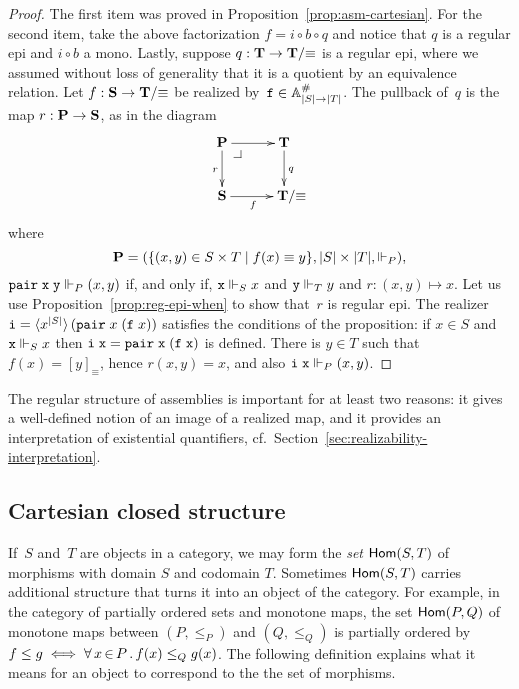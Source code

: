 \begin{proof}
  The first item was proved in Proposition~\ref{prop:asm-cartesian}.
  For the second item, take the above factorization $f = i \circ b
  \circ q$ and notice that $q$ is a regular epi and $i \circ b$ a
  mono. Lastly, suppose $q : \mathbf{T} \to \mathbf{T}/{\equiv}$ is a
  regular epi, where we assumed without loss of generality that it is
  a quotient by an equivalence relation. Let $f : \mathbf{S} \to
  \mathbf{T}/{\equiv}$ be realized by~$\mathtt{f} \in \mathbb{A}^{\#}_{|S| \to |T|}$.
  The pullback of~$q$ is the map $r : \mathbf{P} \to \mathbf{S}$, as in the
  diagram
  \begin{equation*}
    \xymatrix{
      {\asm{P}} \pbcorner
      \ar[r]
      \ar[d]_{r}
      &
      {\asm{T}}
      \ar[d]^{q}
      \\
      {\asm{S}}
      \ar[r]_{f}
      &
      **[r]{\asm{T}/{\equiv}}
      }
  \end{equation*}
  where
  \begin{equation*}
    \mathbf{P} = (\{(x,y) \in S \times T \mid f(x) \equiv y\},
               |S| \times |T|, {\Vdash_P}),
  \end{equation*}
  $\mathtt{pair}\;\mathtt{x}\;\mathtt{y} \Vdash_P (x,y)$ if, and only if, $\mathtt{x} \Vdash_S
  x$ and $\mathtt{y} \Vdash_T y$ and $r : (x,y) \mapsto x$. Let us use
  Proposition~\ref{prop:reg-epi-when} to show that~$r$ is regular epi.
  The realizer $\mathtt{i} =
  \langle x^{|S|} \rangle\,(\mathtt{pair}\;x\;(\mathtt{f}\;x))$ satisfies the
  conditions of the proposition: if $x \in S$ and $\mathtt{x} \Vdash_S x$ then
  $\mathtt{i}\;\mathtt{x} = \mathtt{pair}\;\mathtt{x}\;(\mathtt{f}\;\mathtt{x})$ is defined. There
  is $y \in T$ such that $f(x) = [y]_{\equiv}$, hence $r (x, y) = x$,
  and also $\mathtt{i}\;\mathtt{x} \Vdash_P (x, y)$.
\end{proof}

The regular structure of assemblies is important for at least two
reasons: it gives a well-defined notion of an image of a realized map,
and it provides an interpretation of existential quantifiers, cf.\
Section~\ref{sec:realizability-interpretation}.


\subsection{Cartesian closed structure}
\label{sec:ccc}


If~$S$ and~$T$ are objects in a category, we may form the \emph{set}
$\mathsf{Hom}(S, T)$ of morphisms with domain $S$ and codomain $T$. Sometimes
$\mathsf{Hom}(S, T)$ carries additional structure that turns it into an object
of the category. For example, in the category of partially ordered
sets and monotone maps, the set $\mathsf{Hom}(P,Q)$ of monotone maps between
$(P, {\leq_P})$ and $(Q, {\leq_Q})$ is partially ordered by $f \leq g
\iff \forall\, x \,{\in}\, P\,.\,f(x) \leq_Q g(x)$. The following definition explains
what it means for an object to correspond to the the set of morphisms.

